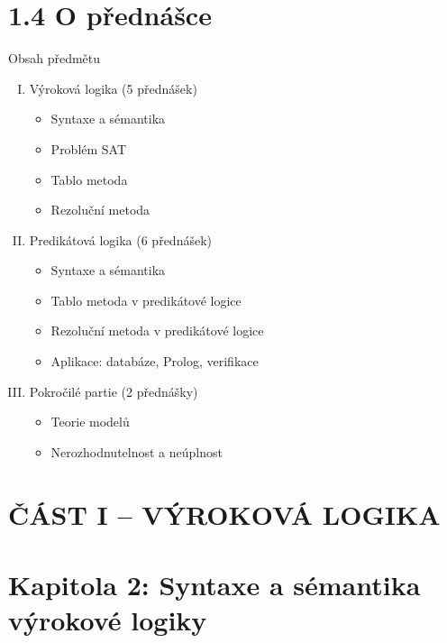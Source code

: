 \documentclass{beamer}
\begin{document}
\section{1.4 O přednášce}


\begin{frame}{Obsah předmětu}

    \begin{enumerate}[I.]
        \item Výroková logika (5 přednášek)
        \begin{itemize}
            \item Syntaxe a sémantika
            \item Problém SAT
            \item Tablo metoda
            \item Rezoluční metoda
        \end{itemize}
        \item Predikátová logika (6 přednášek)
        \begin{itemize}
            \item Syntaxe a sémantika
            \item Tablo metoda v predikátové logice
            \item Rezoluční metoda v predikátové logice
            \item Aplikace: databáze, Prolog, verifikace
        \end{itemize}
        \item Pokročilé partie (2 přednášky)
        \begin{itemize}
            \item Teorie modelů
            \item Nerozhodnutelnost a neúplnost
        \end{itemize}
    \end{enumerate}    

\end{frame}


\section{ČÁST I -- VÝROKOVÁ LOGIKA}


\section{\sc Kapitola 2: Syntaxe a sémantika výrokové logiky}
\end{document}
